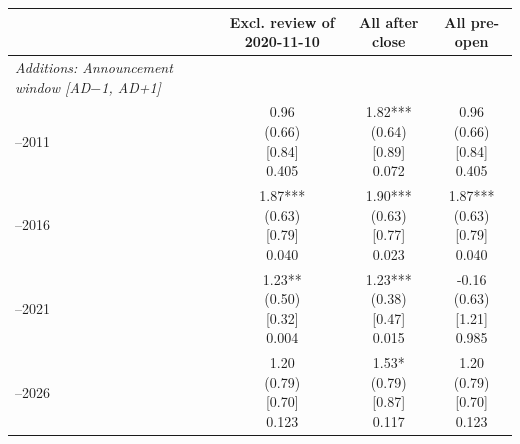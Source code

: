 \begin{threeparttable}
\begingroup
\renewcommand\cellalign{t}
\renewcommand\arraystretch{1}
\setlength{\tabcolsep}{5pt}
\begin{tabular}{@{}lccc}
\toprule
 & Excl. review of 2020-11-10 & All after close & All pre-open \\
\midrule
\emph{Additions: Announcement window [AD$-$1, AD+1]} \\
\addlinespace[0.25ex]
\addlinespace[1ex]
2007–2011 & \makecell{0.96\\(0.66)\\{}[0.84]\\{0.405}} & \makecell{1.82***\\(0.64)\\{}[0.89]\\{0.072}} & \makecell{0.96\\(0.66)\\{}[0.84]\\{0.405}} \\
\addlinespace[0.25ex]
\addlinespace[0.25ex]
2012–2016 & \makecell{1.87***\\(0.63)\\{}[0.79]\\{0.040}} & \makecell{1.90***\\(0.63)\\{}[0.77]\\{0.023}} & \makecell{1.87***\\(0.63)\\{}[0.79]\\{0.040}} \\
\addlinespace[0.25ex]
\addlinespace[0.25ex]
2017–2021 & \makecell{1.23**\\(0.50)\\{}[0.32]\\{0.004}} & \makecell{1.23***\\(0.38)\\{}[0.47]\\{0.015}} & \makecell{-0.16\\(0.63)\\{}[1.21]\\{0.985}} \\
\addlinespace[0.25ex]
\addlinespace[0.25ex]
2022–2026 & \makecell{1.20\\(0.79)\\{}[0.70]\\{0.123}} & \makecell{1.53*\\(0.79)\\{}[0.87]\\{0.117}} & \makecell{1.20\\(0.79)\\{}[0.70]\\{0.123}} \\

\end{tabular}
\end{threeparttable}
